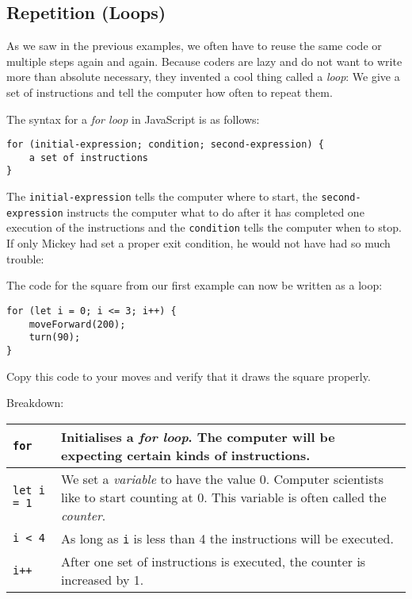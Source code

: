 \documentclass[11pt,a4paper]{report}
\begin{document}
\subsection{Repetition (Loops)}

As we saw in the previous examples, we often have to reuse the same code or multiple steps again and again.  Because coders are lazy and do not want to write more than absolute necessary, they invented a cool thing called a \emph{loop}: We give a set of instructions and tell the computer how often to repeat them. 

The syntax for a \emph{for loop} in JavaScript is as follows:
\begin{verbatim}
for (initial-expression; condition; second-expression) {
	a set of instructions
}
\end{verbatim}
The \verb|initial-expression| tells the computer where to start, the \verb|second-expression| instructs the computer what to do after it has completed one execution of the instructions and the \verb|condition| tells the computer when to stop. If only Mickey had set a proper exit condition, he would not have had so much trouble:

The code for the square from our first example can now be written as a loop:
\begin{verbatim}
for (let i = 0; i <= 3; i++) {
    moveForward(200);
    turn(90);
}
\end{verbatim}
Copy this code to your moves and verify that it draws the square properly.

Breakdown:
\begin{center}
\begin{tabular}{p{3cm}|p{8cm}}
\verb|for| & Initialises a \emph{for loop}. The computer will be expecting certain kinds of instructions.\\
\hline
\verb|let i = 1| & We set a \emph{variable} to have the value 0. Computer scientists like to start counting at 0.  This variable is often called the \emph{counter}.\\
\hline
\verb|i < 4| & As long as \verb|i| is less than 4 the instructions will be executed. \\
\hline
\verb|i++| & After one set of instructions is executed, the counter is increased by 1. 
\end{tabular}
\end{center}

\end{document}
